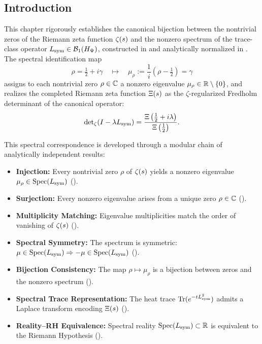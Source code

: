 \subsection*{Introduction}
\label{sec:intro_spectral_correspondence}

This chapter rigorously establishes the canonical bijection between the nontrivial zeros of the Riemann zeta function \( \zeta(s) \) and the nonzero spectrum of the trace-class operator \( L_{\mathrm{sym}} \in \mathcal{B}_1(H_{\Psi}) \), constructed in  and analytically normalized in . The spectral identification map
\[
\rho = \tfrac{1}{2} + i\gamma \quad \longmapsto \quad \mu_\rho := \frac{1}{i}(\rho - \tfrac{1}{2}) = \gamma
\]
assigns to each nontrivial zero \( \rho \in \mathbb{C} \) a nonzero eigenvalue \( \mu_\rho \in \mathbb{R} \setminus \{0\} \), and realizes the completed Riemann zeta function \( \Xi(s) \) as the \(\zeta\)-regularized Fredholm determinant of the canonical operator:
\[
\det\nolimits_{\zeta}(I - \lambda L_{\mathrm{sym}}) = \frac{\Xi\left( \tfrac{1}{2} + i\lambda \right)}{\Xi\left( \tfrac{1}{2} \right)}.
\]

\medskip

This spectral correspondence is developed through a modular chain of analytically independent results:

\begin{itemize}
  \item \textbf{Injection:} Every nontrivial zero \( \rho \) of \( \zeta(s) \) yields a nonzero eigenvalue \( \mu_\rho \in \operatorname{Spec}(L_{\mathrm{sym}}) \) ().
  
  \item \textbf{Surjection:} Every nonzero eigenvalue arises from a unique zero \( \rho \in \mathbb{C} \) ().
  
  \item \textbf{Multiplicity Matching:} Eigenvalue multiplicities match the order of vanishing of \( \zeta(s) \) ().
  
  \item \textbf{Spectral Symmetry:} The spectrum is symmetric: \( \mu \in \operatorname{Spec}(L_{\mathrm{sym}}) \Rightarrow -\mu \in \operatorname{Spec}(L_{\mathrm{sym}}) \) ().
  
  \item \textbf{Bijection Consistency:} The map \( \rho \mapsto \mu_\rho \) is a bijection between zeros and the nonzero spectrum ().
  
  \item \textbf{Spectral Trace Representation:} The heat trace \( \operatorname{Tr}(e^{-t L_{\mathrm{sym}}^2}) \) admits a Laplace transform encoding \( \Xi(s) \) ().
  
  \item \textbf{Reality–RH Equivalence:} Spectral reality \( \operatorname{Spec}(L_{\mathrm{sym}}) \subset \mathbb{R} \) is equivalent to the Riemann Hypothesis ().
\end{itemize}

